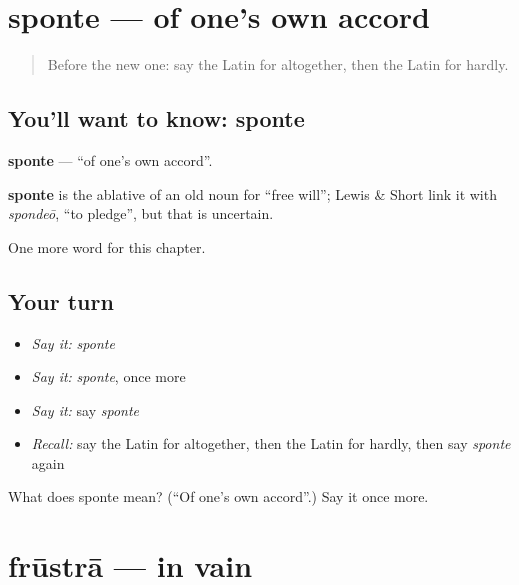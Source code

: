 \section[sponte]{sponte — of one's own accord}

\label{lesson:LA-C211-sponte}



\begin{quote}
Before the new one: say the Latin for altogether, then the Latin for hardly.
\end{quote}

\subsection*{You'll want to know: sponte}
\textbf{sponte} — \textquotedblleft{}of one's own accord\textquotedblright{}.

\begin{cousinweb}
\textbf{sponte} is the ablative of an old noun for \textquotedblleft{}free will\textquotedblright{}; Lewis \& Short link it with \emph{spondeō}, \textquotedblleft{}to pledge\textquotedblright{}, but that is uncertain.
\end{cousinweb}

\begin{grammarlens}[title={What you've built}]
One more word for this chapter.
\end{grammarlens}

\subsection*{Your turn}
\begin{itemize}
\raggedright
  \item \emph{Say it:} \emph{sponte}
  \item \emph{Say it:} \emph{sponte}, once more
  \item \emph{Say it:} say \emph{sponte}
  \item \emph{Recall:} say the Latin for altogether, then the Latin for hardly, then say \emph{sponte} again
\end{itemize}

\begin{tcolorbox}[breakable,colback=teal!4,colframe=teal!35!black,title={Before you move on}]
What does sponte mean? (\textquotedblleft{}Of one's own accord\textquotedblright{}.) Say it once more.
\end{tcolorbox}
\section[frūstrā]{frūstrā — in vain}

